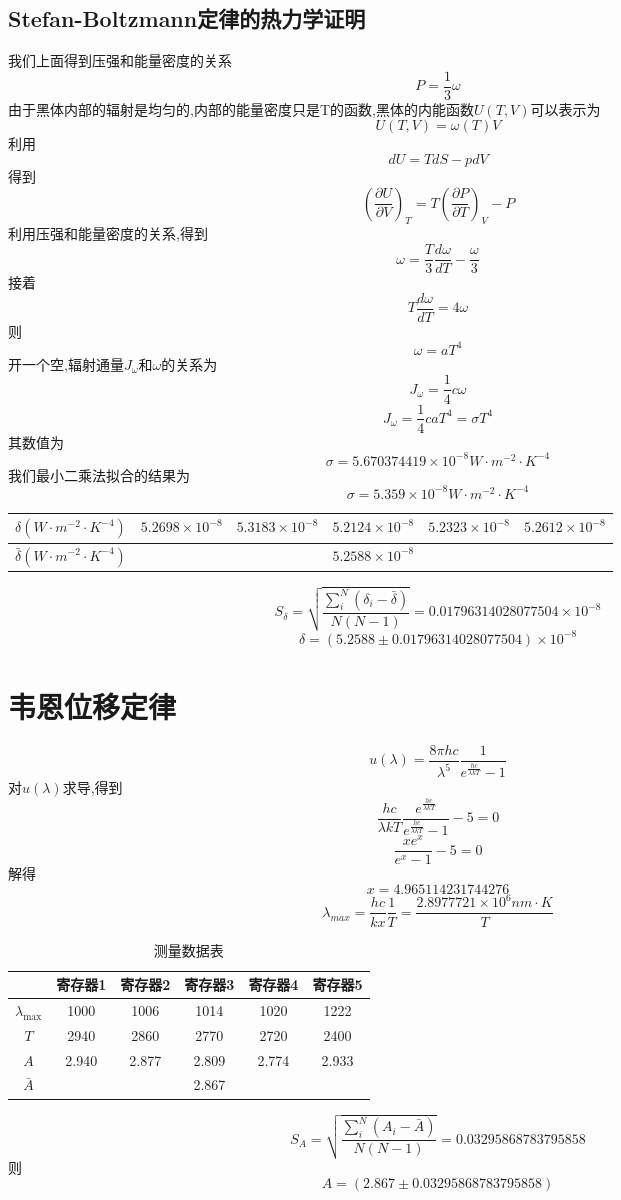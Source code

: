 \documentclass[10pt, a4paper]{article}
\begin{document}
	\subsection{Stefan-Boltzmann定律的热力学证明}
	我们上面得到压强和能量密度的关系
	\[P = \frac{1}{3}\omega\]
	由于黑体内部的辐射是均匀的,内部的能量密度只是T的函数,黑体的内能函数$U(T,V)$可以表示为\[U(T,V)=\omega(T)V\]
	利用\[dU = TdS-pdV\]
	得到\[(\frac{\partial U}{\partial V})_T=T(\frac{\partial P}{\partial T})_V - P\]
	利用压强和能量密度的关系,得到\[\omega = \frac{T}{3}\frac{d\omega}{dT}-\frac{\omega}{3}\]
	接着\[T\frac{d\omega}{dT}=4\omega\]
	则\[\omega=aT^4\]
	开一个空,辐射通量$J_\omega$和$\omega$的关系为\[J_\omega=\frac{1}{4}c\omega\]
	\[J_\omega = \frac{1}{4}caT^4=\sigma T^4\]
	其数值为\[\sigma=5.670374419\times10^{-8}W\cdot m^{-2}\cdot K^{-4}\]
	我们最小二乘法拟合的结果为\[\sigma=5.359\times10^{-8}W\cdot m^{-2}\cdot K^{-4}\]
	\begin{tabular}{|c|c|c|c|c|c|}
		\hline
	    $\delta( W\cdot m^{-2}\cdot K^{-4})$& $5.2698\times10^{-8}$ & $5.3183\times10^{-8}$ & $5.2124\times10^{-8}$ & $5.2323\times10^{-8}$ & 
	    $5.2612\times10^{-8}$ \\
		\hline
		$\bar{\delta}( W\cdot m^{-2}\cdot K^{-4})$&\multicolumn{5}{c|}{$5.2588\times10^{-8}$} \\
		\hline
	\end{tabular}
	\[S_\delta = \sqrt{\frac{\sum_i^N(\delta_i-\bar{\delta})}{N(N-1)}} =0.01796314028077504\times10^{-8}\]
	\[\delta = (5.2588\pm 0.01796314028077504)\times10^{-8}\]
	\section{韦恩位移定律}
	\[u(\lambda)=\frac{8\pi hc}{\lambda^5}\frac{1}{e^{\frac{hc}{\lambda kT}}-1}\]
	对$u(\lambda)$求导,得到
	\[\frac{hc}{\lambda kT}\frac{e^{\frac{hc}{\lambda kT}}}{e^{\frac{hc}{\lambda kT}}-1}-5=0\]
	\[\frac{xe^x}{e^x-1}-5=0\]
	解得\[x = 4.965114231744276\]
	\[\lambda_{max} = \frac{hc}{kx}\frac{1}{T}=\frac{2.8977721\times10^6nm\cdot K}{T}\]

	\begin{table}[htbp]
		\centering
		\caption{测量数据表}
		\begin{tabular}{|c|c|c|c|c|c|}
			\hline
			& 寄存器1 & 寄存器2 & 寄存器3 & 寄存器4 & 寄存器5 \\
			\hline
			$\lambda_{\max}$ & 1000   & 1006   & 1014   & 1020   & 1222   \\
			\hline
			$T$       & 2940   & 2860   & 2770   & 2720   & 2400   \\
			\hline
			$A$       & 2.940  & 2.877  & 2.809  & 2.774  & 2.933  \\
			\hline
			$\bar{A}$ & \multicolumn{5}{c|}{2.867}                             \\
			\hline
		\end{tabular}
		\label{tab:data}
	\end{table} 
	
	\[S_A = \sqrt{\frac{\sum_i^N(A_i-\bar{A})}{N(N-1)}} = 0.03295868783795858\]
	则\[A = (2.867\pm 0.03295868783795858)\]
	
\end{document}
